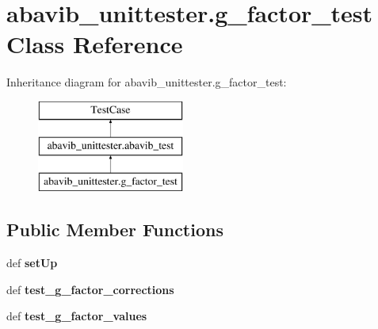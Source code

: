 \hypertarget{classabavib__unittester_1_1g__factor__test}{\section{abavib\+\_\+unittester.\+g\+\_\+factor\+\_\+test Class Reference}
\label{classabavib__unittester_1_1g__factor__test}
}
Inheritance diagram for abavib\+\_\+unittester.\+g\+\_\+factor\+\_\+test\+:\begin{figure}[H]
\begin{center}
\leavevmode
\includegraphics[height=3.000000cm]{classabavib__unittester_1_1g__factor__test}
\end{center}
\end{figure}
\subsection*{Public Member Functions}
\begin{DoxyCompactItemize}
\item 
\hypertarget{classabavib__unittester_1_1g__factor__test_a44307c525420d269bafcd5c08135dcd2}{def {\bfseries set\+Up}}\label{classabavib__unittester_1_1g__factor__test_a44307c525420d269bafcd5c08135dcd2}

\item 
\hypertarget{classabavib__unittester_1_1g__factor__test_ae8ce115d02e8273436b0de4e911bd9d5}{def {\bfseries test\+\_\+g\+\_\+factor\+\_\+corrections}}\label{classabavib__unittester_1_1g__factor__test_ae8ce115d02e8273436b0de4e911bd9d5}

\item 
\hypertarget{classabavib__unittester_1_1g__factor__test_a74eca9dd1aefb68f8f640ebf7333e55b}{def {\bfseries test\+\_\+g\+\_\+factor\+\_\+values}}\label{classabavib__unittester_1_1g__factor__test_a74eca9dd1aefb68f8f640ebf7333e55b}

\end{DoxyCompactItemize}
